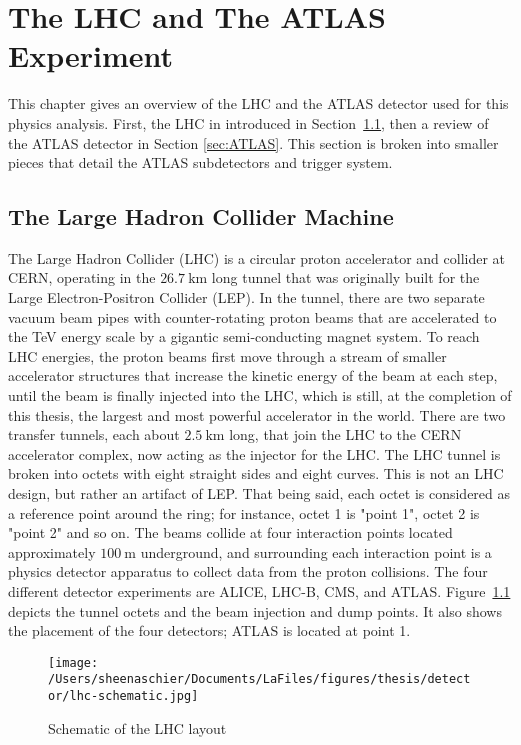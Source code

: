 \chapter{The LHC and The ATLAS Experiment}
\label{ch:detector}
This chapter gives an overview of the LHC and the ATLAS detector used for this physics analysis.  First, the LHC in introduced in Section~\ref{sec:LHC}, then a review of the ATLAS detector in Section \ref{sec:ATLAS}.  This section is broken into smaller pieces that detail the ATLAS subdetectors and trigger system. %
\section{The Large Hadron Collider Machine}
\label{sec:LHC}

The Large Hadron Collider (LHC) is a circular proton accelerator and collider at CERN, operating in the $26.7~\mathrm{km}$ long tunnel that was originally built for the Large Electron-Positron Collider (LEP).  In the tunnel, there are two separate vacuum beam pipes with counter-rotating proton beams that are accelerated to the TeV energy scale by a gigantic semi-conducting magnet system.  To reach LHC energies, the proton beams first move through a stream of smaller accelerator structures that increase the kinetic energy of the beam at each step, until the beam is finally injected into the LHC, which is still, at the completion of this thesis, the largest and most powerful accelerator in the world.  There are two transfer tunnels, each about $2.5~\mathrm{km}$ long, that join the LHC to the CERN accelerator complex, now acting as the injector for the LHC.  The LHC tunnel is broken into octets with eight straight sides and eight curves.  This is not an LHC design, but rather an artifact of LEP.   That being said, each octet is considered as a reference point around the ring; for instance, octet 1 is "point 1", octet 2 is "point 2" and so on.  The beams collide at four interaction points located approximately $100~\mathrm{m}$ underground, and surrounding each interaction point is a physics detector apparatus to collect data from the proton collisions.  The four different detector experiments are ALICE, LHC-B, CMS, and ATLAS.  Figure~\ref{fig:lhc} depicts the tunnel octets and the beam injection and dump points.  It also shows the placement of the four detectors; ATLAS is located at point 1.
  \begin{figure}[tbp]
    \centering
 \texttt{[image: /Users/sheenaschier/Documents/LaFiles/figures/thesis/detector/lhc-schematic.jpg]}
    \caption{Schematic of the LHC layout}
   \label{fig:lhc}
 \end{figure}
 
